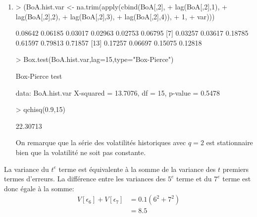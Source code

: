\begin{solution}{1.6}
\begin{enumerate}
\item
\begin{Schunk}
\begin{Sinput}
> (BoA.hist.var <- na.trim(apply(cbind(BoA[,2],
+                                      lag(BoA[,2],1),
+                                      lag(BoA[,2],2),
+                                      lag(BoA[,2],3),
+                                      lag(BoA[,2],4)),
+                                1,
+                                var)))
\end{Sinput}
\begin{Soutput}
 [1] 0.08642 0.06185 0.03017 0.02963 0.02753 0.06795
 [7] 0.03257 0.03617 0.18785 0.61597 0.79813 0.71857
[13] 0.17257 0.06697 0.15075 0.12818
\end{Soutput}
\begin{Sinput}
> Box.test(BoA.hist.var,lag=15,type="Box-Pierce")
\end{Sinput}
\begin{Soutput}
	Box-Pierce test

data:  BoA.hist.var
X-squared = 13.7076, df = 15, p-value = 0.5478
\end{Soutput}
\begin{Sinput}
> qchisq(0.9,15)
\end{Sinput}
\begin{Soutput}
[1] 22.30713
\end{Soutput}
\end{Schunk}

On remarque que la série des volatilités historiques avec $q=2$ est stationnaire bien que la volatilité ne soit pas constante.
\end{enumerate}
\end{solution}
\begin{solution}{1.7}
La variance du $t^e$ terme est équivalente à la somme de la variance des $t$ premiers termes d'erreurs. La différence entre les variances des $5^e$ terme et du $7^e$ terme est donc égale à la somme:
\begin{align*}
\label{eq:2}
V\left[\epsilon_6\right]+V\left[\epsilon_7\right] &= 0.1(6^2+7^2) \\
& = 8.5
\end{align*}
\end{solution}
